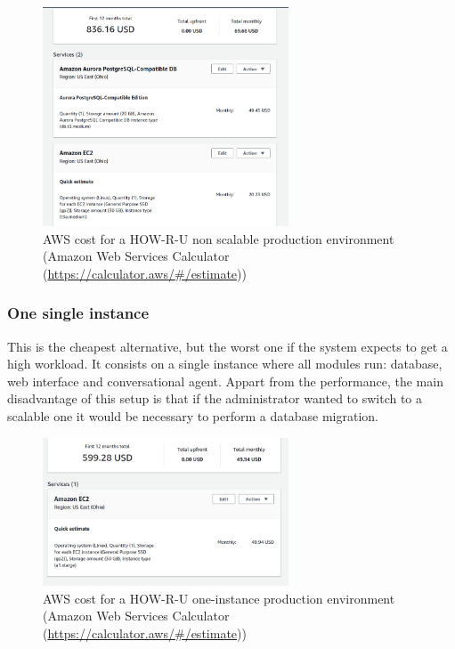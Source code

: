 \documentclass[12pt,english]{article}
\begin{document}
\begin{figure}[H]
  \centering
  \includegraphics[width=0.65\textwidth]{cost_noscalable.png}
  \caption{AWS cost for a HOW-R-U non scalable production environment (Amazon Web Services Calculator (\href{https://calculator.aws/\#/estimate}{https://calculator.aws/\#/estimate}))}
\end{figure}

\subsubsection{One single instance}

This is the cheapest alternative, but the worst one if the system expects to get a high workload. It consists on a single instance where all modules run: database, web interface and conversational agent. Appart from the performance, the main disadvantage of this setup is that if the administrator wanted to switch to a scalable one it would be necessary to perform a database migration.

\begin{figure}[H]
  \centering
  \includegraphics[width=0.65\textwidth]{cost_one.png}
  \caption{AWS cost for a HOW-R-U one-instance production environment (Amazon Web Services Calculator (\href{https://calculator.aws/\#/estimate}{https://calculator.aws/\#/estimate}))}
\end{figure}
\end{document}
